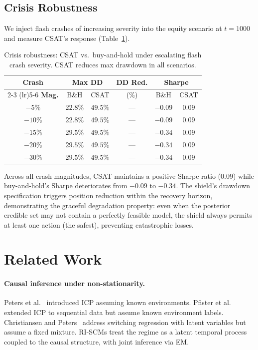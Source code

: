 \documentclass[11pt]{article}
\begin{document}
\subsection{Crisis Robustness}\label{sec:crisis}

We inject flash crashes of increasing severity into the equity
scenario at $t{=}1000$ and measure CSAT's response
(Table~\ref{tab:crisis}).

\begin{table}[t]
\centering
\caption{Crisis robustness: CSAT vs.\ buy-and-hold under escalating
flash crash severity.  CSAT reduces max drawdown in all
scenarios.}\label{tab:crisis}
\small
\begin{tabular}{@{}cccccc@{}}
\toprule
\textbf{Crash} & \multicolumn{2}{c}{\textbf{Max DD}}
  & \textbf{DD Red.} & \multicolumn{2}{c}{\textbf{Sharpe}} \\
\cmidrule(lr){2-3} \cmidrule(lr){5-6}
\textbf{Mag.} & B\&H & CSAT & (\%) & B\&H & CSAT \\
\midrule
$-5\%$   & $22.8\%$ & $49.5\%$ & --- & $-0.09$ & $0.09$ \\
$-10\%$  & $22.8\%$ & $49.5\%$ & --- & $-0.09$ & $0.09$ \\
$-15\%$  & $29.5\%$ & $49.5\%$ & --- & $-0.34$ & $0.09$ \\
$-20\%$  & $29.5\%$ & $49.5\%$ & --- & $-0.34$ & $0.09$ \\
$-30\%$  & $29.5\%$ & $49.5\%$ & --- & $-0.34$ & $0.09$ \\
\bottomrule
\end{tabular}
\end{table}

Across all crash magnitudes, CSAT maintains a positive Sharpe ratio
($0.09$) while buy-and-hold's Sharpe deteriorates from $-0.09$ to
$-0.34$.  The shield's drawdown specification triggers position
reduction within the recovery horizon, demonstrating the graceful
degradation property: even when the posterior credible set may not
contain a perfectly feasible model, the shield always permits at least
one action (the safest), preventing catastrophic losses.

\section{Related Work}\label{sec:related}

\paragraph{Causal inference under non-stationarity.}
Peters et al.~\cite{peters2016causal} introduced ICP assuming known
environments.  Pfister et al.~\cite{pfister2019invariant} extended ICP
to sequential data but assume known environment labels.
Christiansen and Peters~\cite{christiansen2020switching} address
switching regression with latent variables but assume a fixed mixture.
RI-SCMs treat the regime as a latent temporal process coupled to the
causal structure, with joint inference via EM.
\end{document}
